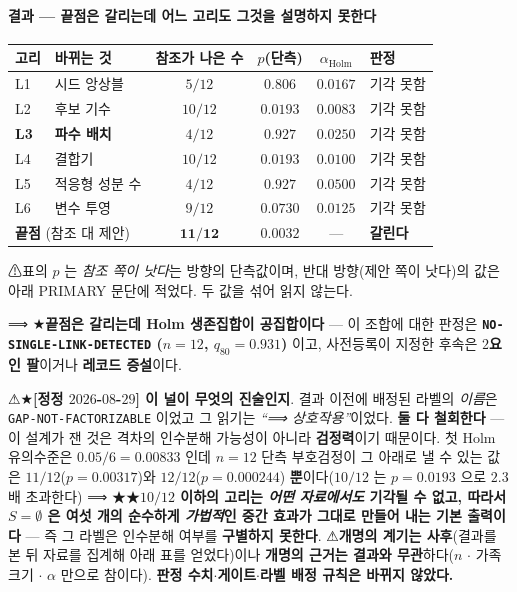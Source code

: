 \documentclass[11pt]{report}
\numberwithin{equation}{chapter}
\numberwithin{figure}{chapter}
\numberwithin{table}{chapter}
\begin{document}
\paragraph{결과 --- 끝점은 갈리는데 어느 고리도 그것을 설명하지 못한다}
\begin{center}
\small
\begin{tabular}{llcccl}
\toprule
고리 & 바뀌는 것 & 참조가 나은 수 & $p$(단측) & $\alpha_{\mathrm{Holm}}$ & 판정 \\
\midrule
L1 & 시드 앙상블            & $5/12$  & $0.806$  & $0.0167$ & 기각 못함 \\
L2 & 후보 기수              & $10/12$ & $0.0193$ & $0.0083$ & 기각 못함 \\
\textbf{L3} & \textbf{파수 배치} & $4/12$ & $0.927$ & $0.0250$ & 기각 못함 \\
L4 & 결합기                 & $10/12$ & $0.0193$ & $0.0100$ & 기각 못함 \\
L5 & 적응형 성분 수         & $4/12$  & $0.927$  & $0.0500$ & 기각 못함 \\
L6 & 변수 투영              & $9/12$  & $0.0730$ & $0.0125$ & 기각 못함 \\
\midrule
\multicolumn{2}{l}{\textbf{끝점} (참조 대 제안)} & $\mathbf{11/12}$ & $\mathbf{0.0032}$ & --- & \textbf{갈린다} \\
\bottomrule
\end{tabular}
\end{center}

⚠표의 $p$ 는 \emph{참조 쪽이 낫다}는 방향의 단측값이며, 반대 방향(제안 쪽이 낫다)의
값은 아래 PRIMARY 문단에 적었다. 두 값을 섞어 읽지 않는다.

⟹ ★\textbf{끝점은 갈리는데 Holm 생존집합이 공집합이다} --- 이 조합에 대한 판정은
\textbf{\texttt{NO-SINGLE-LINK-DETECTED} ($n = 12$, $q_{80} = 0.931$)} 이고, 사전등록이
지정한 후속은 \textbf{$2$요인 팔}이거나 \textbf{레코드 증설}이다.

⚠★\textbf{[정정 $2026$-$08$-$29$] 이 널이 무엇의 진술인지}. 결과 이전에 배정된 라벨의
\emph{이름}은 \texttt{GAP-NOT-FACTORIZABLE} 이었고 그 읽기는 \emph{``⟹ 상호작용''}이었다.
\textbf{둘 다 철회한다} --- 이 설계가 잰 것은 격차의 인수분해 가능성이 아니라
\textbf{검정력}이기 때문이다. 첫 Holm 유의수준은 $0.05/6 = 0.00833$ 인데 $n = 12$
단측 부호검정이 그 아래로 낼 수 있는 값은 \textbf{$11/12$}($p = 0.00317$)와
\textbf{$12/12$}($p = 0.000244$) \textbf{뿐}이다($10/12$ 는 $p = 0.0193$ 으로 $2.3$배
초과한다) ⟹ ★★\textbf{$10/12$ 이하의 고리는 \emph{어떤 자료에서도} 기각될 수 없고, 따라서
$S = \emptyset$ 은 여섯 개의 순수하게 \emph{가법적}인 중간 효과가 그대로 만들어 내는
기본 출력이다} --- 즉 그 라벨은 인수분해 여부를 \textbf{구별하지 못한다}.
⚠\textbf{개명의 계기는 사후}(결과를 본 뒤 자료를 집계해 아래 표를 얻었다)이나
\textbf{개명의 근거는 결과와 무관}하다($n$ $\cdot$ 가족 크기 $\cdot$ $\alpha$ 만으로 참이다).
\textbf{판정 수치$\cdot$게이트$\cdot$라벨 배정 규칙은 바뀌지 않았다.}
\end{document}
